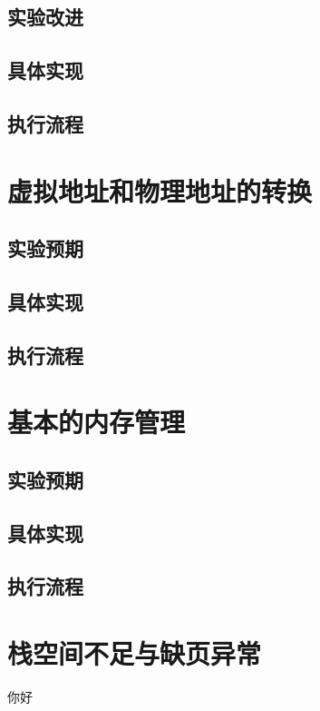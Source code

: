 \subsection{实验改进}

\subsection{具体实现}

\subsection{执行流程}

\section{虚拟地址和物理地址的转换}

\subsection{实验预期}

\subsection{具体实现}

\subsection{执行流程}

\section{基本的内存管理}

\subsection{实验预期}

\subsection{具体实现}

\subsection{执行流程}

\section{栈空间不足与缺页异常}
你好
